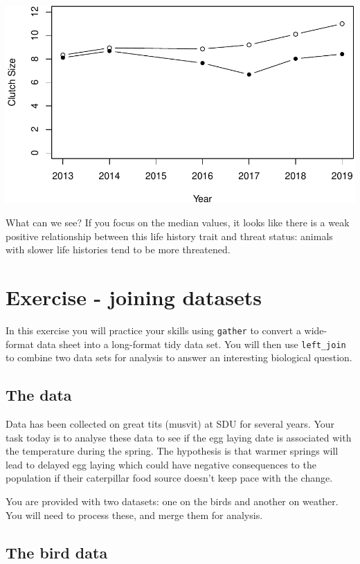 \documentclass[
  a4paperpaper,
]{book}
\begin{document}
\includegraphics{BB852_files/figure-latex/unnamed-chunk-68-1.pdf}

What can we see? If you focus on the median values, it looks like there is a weak positive relationship between this life history trait and threat status: animals with slower life histories tend to be more threatened.

\hypertarget{exercise---joining-datasets}{%
\section{Exercise - joining datasets}\label{exercise---joining-datasets}}

In this exercise you will practice your skills using \texttt{gather} to convert a wide-format data sheet into a long-format tidy data set. You will then use \texttt{left\_join} to combine two data sets for analysis to answer an interesting biological question.

\hypertarget{the-data}{%
\subsection{The data}\label{the-data}}

Data has been collected on great tits (musvit) at SDU for several years. Your task today is to analyse these data to see if the egg laying date is associated with the temperature during the spring. The hypothesis is that warmer springs will lead to delayed egg laying which could have negative consequences to the population if their caterpillar food source doesn't keep pace with the change.

You are provided with two datasets: one on the birds and another on weather. You will need to process these, and merge them for analysis.

\hypertarget{the-bird-data}{%
\subsection{The bird data}\label{the-bird-data}}
\end{document}
